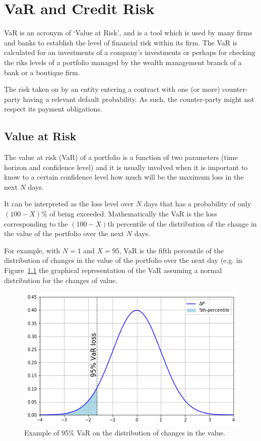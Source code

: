 \chapter{VaR and Credit Risk}\label{var-and-credit-risk}

VaR is an acronym of ‘Value at Risk’, and is a tool which is used by many firms and banks to establish the level of financial risk within its firm. The VaR is calculated for an investments of a company’s investments or perhaps for checking the riks levels of a portfolio managed by the wealth management branch of a bank or a boutique firm.


The risk taken on by an entity entering a contract with one (or more) counter-party having a relevant default
probability. As such, the counter-party might not respect its payment obligations.


\section{Value at Risk}\label{value-at-risk}

The value at risk (VaR) of a portfolio is a function of two parameters
(time horizon and confidence level) and it is usually involved when it
is important to know to a certain confidence level how
much will be the maximum loss in the next $N$ days. 

It can be interpreted as the loss level over \(N\) days that has a 
probability of only \((100 - X)\%\) of being exceeded.
Mathematically the VaR is the loss corresponding to the
\((100-X)\textrm{th}\) percentile of the distribution of the change in
the value of the portfolio over the next \(N\) days. 

For example, with \(N=1\) and \(X=95\), VaR is the fifth percentile of the distribution of
changes in the value of the portfolio over the next day (e.g. in Figure~\ref{fig:var_loss}
the graphical representation of the VaR assuming a normal
distribution for the changes of value.

\begin{figure}
\centering
  \includegraphics[width=0.6\linewidth]{figures/95_var.png}
  \caption{Example of 95\% VaR on the distribution of changes in the value.}
  \label{fig:var_loss}
\end{figure}
    
